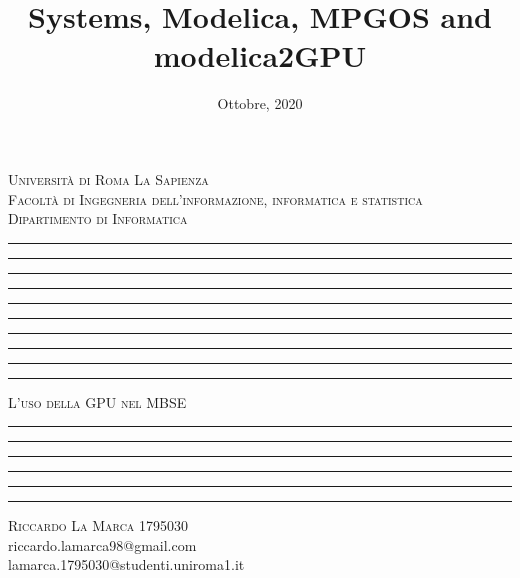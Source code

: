 \documentclass[11pt]{report}
\title{Systems, Modelica, MPGOS and modelica2GPU}
\date{Ottobre, 2020}
\makeatletter
\let\documentTitle\@title
\let\academicYear\@date
\makeatother
\begin{document}
\begin{titlepage}
    \centering
    \textsc{\Large Università di Roma La Sapienza\\[.3cm]Facoltà di Ingegneria dell'informazione, informatica e statistica\\[.3cm]Dipartimento di Informatica}
    \vspace*{1cm}
    \hrule\hrule\hrule\hrule\hrule
    \vspace*{0.1cm}
    \hrule\hrule\hrule\hrule\hrule
    \vspace*{1cm}
    \textsc{\Huge L'uso della GPU nel MBSE}
    \vspace*{1cm}
    \hrule\hrule
    \vspace*{1cm}
    \textbf{\Large \documentTitle}
    \vspace*{1cm}
    \hrule\hrule\hrule\hrule
    \vspace*{3cm}
    \textsc{\large Riccardo La Marca 1795030}\\
    \vspace*{.2cm}
    {\large riccardo.lamarca98@gmail.com}\\
    \vspace*{.2cm}
    {\large lamarca.1795030@studenti.uniroma1.it}\\
    \vspace*{8cm}
    {\normalsize \academicYear}
\end{titlepage}
\tableofcontents


\end{document}
